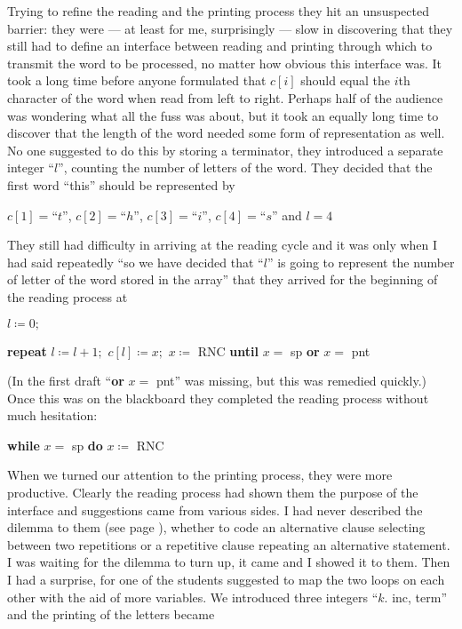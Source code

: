 Trying to refine the reading and the printing process they hit an unsuspected barrier: they were --- at least for me, surprisingly --- slow in discovering that they still had to define an interface between reading and printing through which to transmit the word to be processed, no matter how obvious this interface was. It took a long time before anyone formulated that $c[i]$ should equal the $i$th character of the word when read from left to right. Perhaps half of the audience was wondering what all the fuss was about, but it took an equally long time to discover that the length of the word needed some form of representation as well. No one suggested to do this by storing a terminator, they introduced a separate integer ``$l$'', counting the number of letters of the word. They decided that the first word ``this'' should be represented by

\quad $c[1] = $``$t$'', $c[2] = $``$h$'', $c[3] = $``$i$'', $c[4] = $``$s$'' and $l = 4$

They still had difficulty in arriving at the reading cycle and it was only when I had said repeatedly ``so we have decided that ``$l$'' is going to represent the number of letter of the word stored in the array'' that they arrived for the beginning of the reading process at

\quad $l \coloneq 0; $

\quad \textbf{repeat} $l \coloneq l + 1;$ $c[l] \coloneq x;$ $x\coloneq$ RNC \textbf{until} $x =$ sp \textbf{or} $x =$ pnt

\noindent
(In the first draft ``\textbf{or} $x =$ pnt'' was missing, but this was remedied quickly.) Once this was on the blackboard they completed the reading process without much hesitation:

\quad \textbf{while} $x =$ sp \textbf{do} $x\coloneq$ RNC

When we turned our attention to the printing process, they were more productive. Clearly the reading process had shown them the purpose of the interface and suggestions came from various sides. I had never described the dilemma to them (see page \pageref{pg:dilema}), whether to code an alternative clause selecting between two repetitions or a repetitive clause repeating an alternative statement. I was waiting for the dilemma to turn up, it came and I showed it to them. Then I had a surprise, for one of the students suggested to map the two loops on each other with the aid of more variables. We introduced three integers ``$k$. inc, term'' and the printing of the letters became

